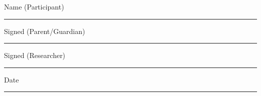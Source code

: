 \vspace{5mm}

Name (Participant) \rule{5cm}{0.15mm}

Signed (Parent/Guardian) \rule{5cm}{0.15mm}

Signed (Researcher) \rule{3cm}{0.15mm} Date \rule{2cm}{0.15mm}


